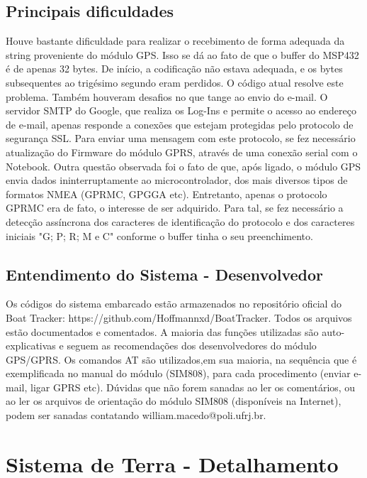 \subsection{Principais dificuldades}
\hspace{0.5cm} Houve bastante dificuldade para realizar o recebimento de forma adequada da string proveniente do módulo GPS. Isso se dá ao fato de que o buffer do MSP432 é de apenas 32 bytes. De início, a codificação não estava adequada, e os bytes subsequentes ao trigésimo segundo eram perdidos. O código atual resolve este problema. Também houveram desafios no que tange ao envio do e-mail. O servidor SMTP do Google, que realiza os Log-Ins e permite o acesso ao endereço de e-mail, apenas responde a conexões que estejam protegidas pelo protocolo de segurança SSL. Para enviar uma mensagem com este protocolo, se fez necessário atualização do Firmware do módulo GPRS, através de uma conexão serial com o Notebook. Outra questão observada foi o fato de que, após ligado, o módulo
GPS envia dados ininterruptamente ao microcontrolador, dos mais diversos tipos de formatos NMEA (GPRMC, GPGGA etc). Entretanto, apenas o protocolo GPRMC era de fato, o interesse de ser adquirido. Para tal, se fez necessário a detecção assíncrona dos caracteres de identificação do protocolo e dos caracteres iniciais "G; P; R; M e C" conforme o buffer tinha o seu preenchimento. 

\subsection{Entendimento do Sistema - Desenvolvedor}
\hspace{0.5cm} Os códigos do sistema embarcado estão armazenados no repositório oficial do Boat Tracker: https://github.com/Hoffmannxd/BoatTracker. Todos os arquivos estão documentados e comentados. A maioria das funções utilizadas são auto-explicativas e seguem as recomendações dos desenvolvedores do módulo GPS/GPRS. Os comandos AT são utilizados,em sua maioria, na sequência que é exemplificada no manual do módulo (SIM808), para cada procedimento (enviar e-mail, ligar GPRS etc). Dúvidas que não forem sanadas ao ler os comentários, ou ao ler os arquivos de orientação do módulo SIM808 (disponíveis na Internet), podem ser sanadas contatando william.macedo@poli.ufrj.br.

\section{Sistema de Terra - Detalhamento}


